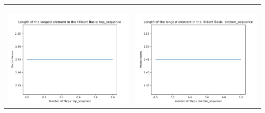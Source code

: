 \documentclass[10pt]{article}
\begin{document}
\begin{tabular}{c|c}
\begin{minipage}{.45\textwidth}
\end{minipage} \\ \\
\hline \\\begin{minipage}{.45\textwidth}
\includegraphics[width=\textwidth]{"DATA/5d/6 generators 1 bound C/top_sequence LENGTH"}
\end{minipage} &
\begin{minipage}{.45\textwidth}
\includegraphics[width=\textwidth]{"DATA/5d/6 generators 1 bound C bottomup/bottom_sequence LENGTH"}
\end{minipage}
\end{tabular}
\end{document}
